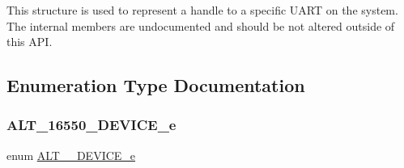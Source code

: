This structure is used to represent a handle to a specific U\+A\+RT on the system. The internal members are undocumented and should be not altered outside of this A\+PI. 

\subsection{Enumeration Type Documentation}
\mbox{\label{group__UART__BASIC_gaaba218dfc8c12ed9a1204aede9a02ee7}} 
\subsubsection{\texorpdfstring{ALT\_16550\_DEVICE\_e}{ALT\_16550\_DEVICE\_e}}
{\footnotesize\ttfamily enum \mbox{\hyperlink{group__UART__BASIC_gaaba218dfc8c12ed9a1204aede9a02ee7}{A\+L\+T\+\_\+\_\+\+D\+E\+V\+I\+C\+E\+\_\+e}}}

